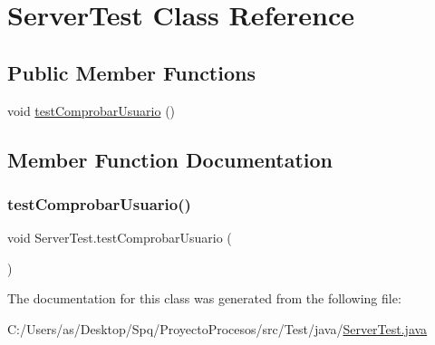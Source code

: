 \hypertarget{class_server_test}{}\section{Server\+Test Class Reference}
\label{class_server_test}
\subsection*{Public Member Functions}
\begin{DoxyCompactItemize}
\item 
void \mbox{\hyperlink{class_server_test_a7dc778001059c1afb131eb57d82aac8b}{test\+Comprobar\+Usuario}} ()
\end{DoxyCompactItemize}


\subsection{Member Function Documentation}
\mbox{\label{class_server_test_a7dc778001059c1afb131eb57d82aac8b}} 
\subsubsection{\texorpdfstring{testComprobarUsuario()}{testComprobarUsuario()}}
{\footnotesize\ttfamily void Server\+Test.\+test\+Comprobar\+Usuario (\begin{DoxyParamCaption}{ }\end{DoxyParamCaption})}



The documentation for this class was generated from the following file\+:\begin{DoxyCompactItemize}
\item 
C\+:/\+Users/as/\+Desktop/\+Spq/\+Proyecto\+Procesos/src/\+Test/java/\mbox{\hyperlink{_server_test_8java}{Server\+Test.\+java}}\end{DoxyCompactItemize}
